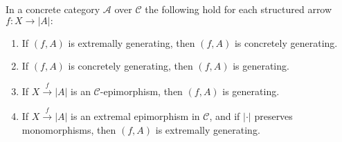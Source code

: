 \begin{prop}
    In a concrete category $\mathcal{A}$ over $\mathcal{C}$ the following hold for each structured arrow $f: X \rightarrow|A|:$
    \begin{enumerate}
        \item If $(f, A)$ is extremally generating, then $(f, A)$ is concretely generating.
        \item If $(f, A)$ is concretely generating, then $(f, A)$ is generating.
        \item If $X \xrightarrow{f}|A|$ is an $\mathcal{C}$-epimorphism, then $(f, A)$ is generating.
        \item If $X \xrightarrow{f}|A|$ is an extremal epimorphism in $\mathcal{C}$, and if $\vert \cdot \vert$ preserves monomorphisms, then $(f, A)$ is extremally generating.
    \end{enumerate}
\end{prop}

